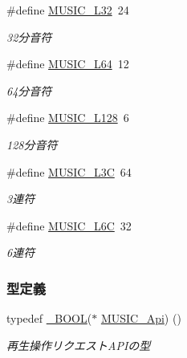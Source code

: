 \begin{DoxyCompactItemize}
\#define \hyperlink{music_8h_a63721aef2801ea3c18b73eeb6a1bb28f_a63721aef2801ea3c18b73eeb6a1bb28f}{M\+U\+S\+I\+C\+\_\+\+L32}~24
\begin{DoxyCompactList}\small\item\em 32分音符 \end{DoxyCompactList}\item 
\#define \hyperlink{music_8h_ab39506114b70023be5b84b891acac4f5_ab39506114b70023be5b84b891acac4f5}{M\+U\+S\+I\+C\+\_\+\+L64}~12
\begin{DoxyCompactList}\small\item\em 64分音符 \end{DoxyCompactList}\item 
\#define \hyperlink{music_8h_a4d436e1851fe844fe2eceb5c428c645e_a4d436e1851fe844fe2eceb5c428c645e}{M\+U\+S\+I\+C\+\_\+\+L128}~6
\begin{DoxyCompactList}\small\item\em 128分音符 \end{DoxyCompactList}\item 
\#define \hyperlink{music_8h_a7fef6bc530066e840077bad2399af558_a7fef6bc530066e840077bad2399af558}{M\+U\+S\+I\+C\+\_\+\+L3\+C}~64
\begin{DoxyCompactList}\small\item\em 3連符 \end{DoxyCompactList}\item 
\#define \hyperlink{music_8h_a4ffa962d26402e1549bbb77cec186912_a4ffa962d26402e1549bbb77cec186912}{M\+U\+S\+I\+C\+\_\+\+L6\+C}~32
\begin{DoxyCompactList}\small\item\em 6連符 \end{DoxyCompactList}\end{DoxyCompactItemize}
\subsubsection*{型定義}
\begin{DoxyCompactItemize}
\item 
typedef \hyperlink{stddef_8h_afbf708854fe02af8475a9ba02f3196cb_afbf708854fe02af8475a9ba02f3196cb}{\+\_\+\+B\+O\+O\+L}($\ast$ \hyperlink{music_8h_a29e828a1710e2f01e14484306a5a35f6_a29e828a1710e2f01e14484306a5a35f6}{M\+U\+S\+I\+C\+\_\+\+Api}) ()
\begin{DoxyCompactList}\small\item\em 再生操作リクエスト\+A\+P\+Iの型 \end{DoxyCompactList}\end{DoxyCompactItemize}
